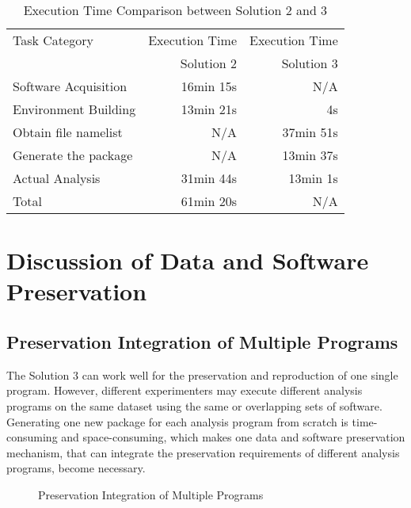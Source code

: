 \documentclass{acm_proc_article-sp}
\begin{document}
\begin{table}
    \centering
    \begin{tabular}{|l|r|r|}
    \hline
    Task Category & Execution Time & Execution Time \\
    & Solution 2 & Solution 3\\ \hline
    Software Acquisition & 16min 15s & N/A \\ \hline
    Environment Building & 13min 21s  & 4s \\ \hline
    Obtain file namelist & N/A & 37min 51s \\ \hline
    Generate the package & N/A & 13min 37s \\ \hline
    Actual Analysis & 31min 44s & 13min 1s \\ \hline
    Total & 61min 20s & N/A \\ \hline
    \end{tabular}
    \caption{Execution Time Comparison between Solution 2 and 3}
    \label{table:time-2nd3rd}
\end{table}    

\section{Discussion of Data and Software Preservation}
\subsection{Preservation Integration of Multiple Programs}
The Solution 3 can work well for the preservation and reproduction of one single program. However, different experimenters may execute different analysis programs on the same dataset using the same or overlapping sets of software. Generating one new package for each analysis program from scratch is time-consuming and space-consuming, which makes one data and software preservation mechanism, that can integrate the preservation requirements of different analysis programs, become necessary. 

\begin{figure*}
\centering
{}
\caption{Preservation Integration of Multiple Programs}
\label{fig:Preservation integration}
\end{figure*}
\end{document}

